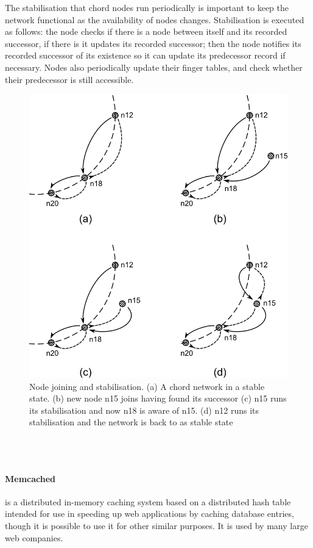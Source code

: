 \documentclass{article}
\begin{document}
The stabilisation that chord nodes run periodically is important to keep the network functional as the availability of nodes changes. Stabilisation is executed as follows: the node checks if there is a node between itself and its recorded successor, if there is it updates its recorded successor; then the node notifies its recorded successor of its existence so it can update its predecessor record if necessary. Nodes also periodically update their finger tables, and check whether their predecessor is still accessible.
\begin{figure}
\centering
\includegraphics{chord_joining.png}
\caption{Node joining and stabilisation. (a) A chord network in a stable state. (b) new node n15 joins having found its successor (c) n15 runs its stabilisation and now n18 is aware of n15. (d) n12 runs its stabilisation and the network is back to as stable state}
\end{figure}
\\
\\
\paragraph{Memcached} \cite{memcached} is a distributed in-memory caching system based on a distributed hash table intended for use in speeding up web applications by caching database entries, though it is possible to use it for other similar purposes. It is used by many large web companies.
\end{document}
